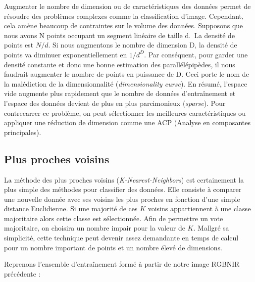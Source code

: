 \documentclass[
  french,
  11pt,
  letterpaper,
  open=any,
  twoside=false,
  french]{scrbook}
\begin{document}
Augmenter le nombre de dimension ou de caractéristiques des données
permet de résoudre des problèmes complexes comme la classification
d'image. Cependant, cela amène beaucoup de contraintes sur le volume des
données. Supposons que nous avons N points occupant un segment linéaire
de taille d.~La densité de points est \(N/d\). Si nous augmentons le
nombre de dimension D, la densité de points va diminuer
exponentiellement en \(1/d^D\). Par conséquent, pour garder une densité
constante et donc une bonne estimation des parallélépipèdes, il nous
faudrait augmenter le nombre de points en puissance de D. Ceci porte le
nom de la malédiction de la dimensionnalité (\emph{dimensionality
curse}). En résumé, l'espace vide augmente plus rapidement que le nombre
de données d'entraînement et l'espace des données devient de plus en
plus parcimonieux (\emph{sparse}). Pour contrecarrer ce problème, on
peut sélectionner les meilleures caractéristiques ou appliquer une
réduction de dimension comme une ACP (Analyse en composantes
principales).

\subsection{Plus proches voisins}\label{plus-proches-voisins}

La méthode des plus proches voisins (\emph{K-Nearest-Neighbors}) est
certainement la plus simple des méthodes pour classifier des données.
Elle consiste à comparer une nouvelle donnée avec ses voisins les plus
proches en fonction d'une simple distance Euclidienne. Si une majorité
de ces \(K\) voisins appartiennent à une classe majoritaire alors cette
classe est sélectionnée. Afin de permettre un vote majoritaire, on
choisira un nombre impair pour la valeur de \(K\). Mallgré sa
simplicité, cette technique peut devenir assez demandante en temps de
calcul pour un nombre important de points et un nombre élevé de
dimensions.

Reprenons l'ensemble d'entraînement formé à partir de notre image RGBNIR
précédente :
\end{document}
